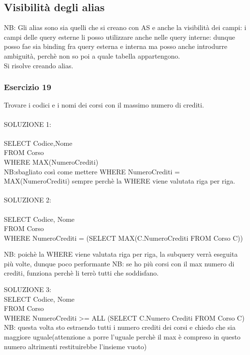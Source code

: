 \documentclass{article}
\begin{document}
\subsection{Visibilità degli alias}
NB: Gli alias sono sia quelli che si creano con AS e anche la visibilità dei campi: i campi delle query esterne li posso utilizzare anche nelle query interne: dunque posso fae sia binding fra query esterna e interna ma posso anche introdurre ambiguità, perchè non so poi a quale tabella appartengono.\\
Si risolve creando alias.

\subsubsection{Esercizio 19}
Trovare i codici e i nomi dei corsi con il massimo numero di crediti.\\
\\
SOLUZIONE 1:\\
\\
SELECT Codice,Nome\\
FROM Corso\\
WHERE MAX(NumeroCrediti)\\
NB:sbagliato così come mettere WHERE NumeroCrediti = MAX(NumeroCrediti) sempre perchè la WHERE viene valutata riga per riga.\\
\\
SOLUZIONE 2:\\
\\
SELECT Codice, Nome\\
FROM Corso\\
WHERE NumeroCrediti = (SELECT MAX(C.NumeroCrediti FROM Corso C))

NB: poichè la WHERE viene valutata riga per riga, la subquery verrà eseguita più volte, dunque poco performante
NB: se ho più corsi con il max numero di crediti, funziona perchè li terrò tutti che soddisfano.

SOLUZIONE 3:\\
SELECT Codice, Nome\\
FROM Corso\\
WHERE NumeroCrediti >= ALL (SELECT C.Numero Crediti FROM Corso C)
NB: questa volta sto estraendo tutti i numero crediti dei corsi e chiedo che sia maggiore uguale(attenzione a porre l'uguale perchè il max è compreso in questo numero altrimenti restituirebbe l'insieme vuoto)
\end{document}
